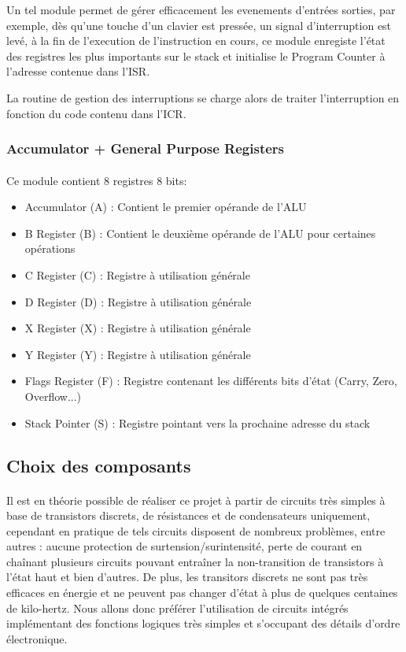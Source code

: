 \documentclass{article}
\begin{document}
    Un tel module permet de gérer efficacement les evenements d'entrées sorties, par exemple, dès qu'une touche
    d'un clavier est pressée, un signal d'interruption est levé, à la fin de l'execution de l'instruction en cours,
    ce module enregiste l'état des registres les plus importants sur le stack et initialise le Program Counter
     à l'adresse contenue dans l'ISR. 


    La routine de gestion des interruptions se charge alors de traiter l'interruption en fonction du code 
    contenu dans l'ICR.


    \subsubsection{Accumulator + General Purpose Registers}
    \paragraph{}
    Ce module contient 8 registres 8 bits:

    \begin{itemize}
        \item Accumulator (A) : Contient le premier opérande de l'ALU
        \item B Register (B) : Contient le deuxième opérande de l'ALU pour certaines opérations 
        \item C Register (C) : Registre à utilisation générale 
        \item D Register (D) : Registre à utilisation générale 
        \item X Register (X) : Registre à utilisation générale 
        \item Y Register (Y) : Registre à utilisation générale 
        \item Flags Register (F) : Registre contenant les différents bits d'état (Carry, Zero, Overflow...)
        \item Stack Pointer (S) : Registre pointant vers la prochaine adresse du stack
    \end{itemize}

    \subsection{Choix des composants}

    \paragraph{}
    Il est en théorie possible de réaliser ce projet à partir de circuits très simples à base de transistors
    discrets, de résistances et de condensateurs uniquement, cependant en pratique de tels circuits
    disposent de nombreux problèmes, entre autres : aucune protection de surtension/surintensité, perte
    de courant en chaînant plusieurs circuits pouvant entraîner la non-transition de transistors à l'état
    haut et bien d'autres. De plus, les transitors discrets ne sont pas très efficaces en énergie et ne
    peuvent pas changer d'état à plus de quelques centaines de kilo-hertz. Nous allons donc préférer
    l'utilisation de circuits intégrés implémentant des fonctions logiques très simples et s'occupant des
    détails d'ordre électronique.
\end{document}
